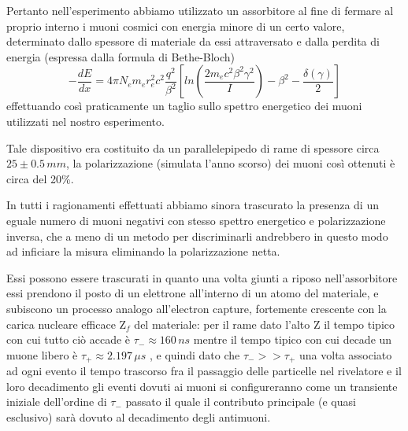 Pertanto nell'esperimento abbiamo utilizzato un assorbitore al fine di fermare al proprio interno i muoni cosmici con energia minore di un certo valore, determinato dallo spessore di materiale da essi attraversato e dalla perdita di energia (espressa dalla formula di Bethe-Bloch) 
$$-\frac{dE}{dx}=4\pi N_e m_e r_e^2 c^2 \frac{q^2}{\beta^2}[ln(\frac{2m_e c^2 \beta^2 \gamma^2}{I})-\beta^2-\frac{\delta(\gamma)}{2}]$$ 
effettuando così praticamente un taglio sullo spettro energetico dei muoni utilizzati nel nostro esperimento. \par
Tale dispositivo era costituito da un parallelepipedo di rame di spessore circa $25\pm0.5 \, mm$, la polarizzazione (simulata l'anno scorso) dei muoni così ottenuti è circa del 20\%. \par
In tutti i ragionamenti effettuati abbiamo sinora trascurato la presenza di un eguale numero di muoni negativi con stesso spettro energetico e polarizzazione inversa, che a meno di un metodo per discriminarli andrebbero in questo modo ad inficiare la misura eliminando la polarizzazione netta. \par
Essi possono essere trascurati in quanto una volta giunti a riposo nell'assorbitore essi prendono il posto di un elettrone all'interno di un atomo del materiale, e subiscono un  processo analogo all'electron capture, fortemente crescente con la carica nucleare efficace Z$_f$ del materiale: per il rame dato l'alto Z il tempo tipico con cui tutto ciò accade è $\tau_-\approx 160 \, ns$ \cite{bib:Suzuki:1987jf} mentre il tempo tipico con cui decade un muone libero è $\tau_+\approx 2.197 \, \mu s$ \cite{bib:Patrignani:2016xqp}, e quindi dato che $\tau_->>\tau_+$ una volta associato ad ogni evento il tempo trascorso fra il passaggio delle particelle nel rivelatore e il loro decadimento gli eventi dovuti ai muoni si configureranno come un transiente iniziale dell'ordine di $\tau_-$ passato il quale il contributo principale (e quasi esclusivo) sarà dovuto al decadimento degli antimuoni. \par

